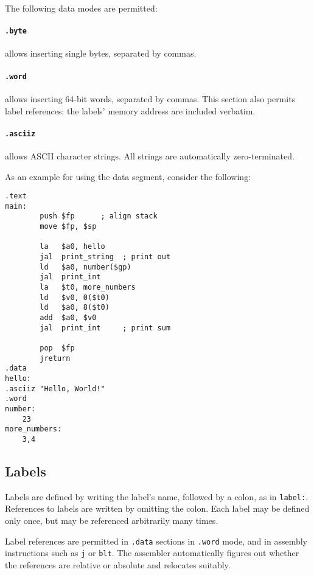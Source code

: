 \documentclass{article}
\begin{document}
The following data modes are permitted:

\paragraph{\texttt{.byte}} allows inserting single bytes, separated by commas.

\paragraph{\texttt{.word}} allows inserting 64-bit words, separated by commas.  This section
also permits label references: the labels' memory address are included verbatim.

\paragraph{\texttt{.asciiz}} allows ASCII character strings.  All strings are automatically
zero-terminated.

As an example for using the data segment, consider the following:

\begin{lstlisting}
.text
main:
        push $fp      ; align stack
        move $fp, $sp

        la   $a0, hello
        jal  print_string  ; print out
        ld   $a0, number($gp)
        jal  print_int
        la   $t0, more_numbers
        ld   $v0, 0($t0)
        ld   $a0, 8($t0)
        add  $a0, $v0
        jal  print_int     ; print sum

        pop  $fp
        jreturn
.data
hello:
.asciiz "Hello, World!"
.word
number:
	23
more_numbers:
	3,4
\end{lstlisting}

\subsection{Labels}

Labels are defined by writing the label's name, followed by a colon, as in \texttt{label:}.
References to labels are written by omitting the colon.  Each label may be defined only once,
but may be referenced arbitrarily many times.

Label references are permitted in \texttt{.data} sections in \texttt{.word} mode, and in
assembly instructions such as \texttt{\textcolor{dblue}{j}} or \texttt{\textcolor{dblue}{blt}}.  The
assembler automatically figures out whether the references are relative or absolute and relocates suitably.
\end{document}
